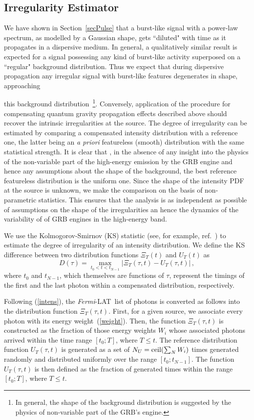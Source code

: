 \documentclass[12pt]{article}
\newcommand{\beq}{\begin{equation}}
\newcommand{\eeq}{\end{equation}}
\newcommand{\lat}{{\it Fermi}-LAT}
\begin{document}
\subsection{Irregularity Estimator}
\label{sec:ks}

We have shown in Section~\ref{secPulse} that a burst-like signal with a power-law spectrum,
as modelled by a Gaussian shape, gets ``diluted"
with time as it propagates in a dispersive medium. In general, a qualitatively similar result is expected
for a signal possessing any kind of  burst-like activity {superposed on a ``regular" background distribution}.
Thus we expect that during dispersive
propagation any irregular signal with burst-like features degenerates in shape, approaching
{this background distribution~\footnote{In general, the shape of the background distribution is suggested
by the physics of non-variable part of the GRB's engine.}.
Conversely, application of the procedure for compensating
quantum gravity propagation effects described above should
recover the intrinsic irregularities at the source. The degree of irregularity
can be estimated by comparing a compensated intensity distribution with a reference one, the latter being  an
{\it a priori} featureless {(smooth)} distribution with the same statistical strength.
It is clear that {, in the absence of any insight into the physics of the non-variable part of the
high-energy emission by the GRB engine and hence
any assumptions about the shape of the background,}
the best reference featureless distribution is the uniform one.
Since the shape of the intensity PDF at the source is unknown, we make the
comparison on the basis of non-parametric statistics.
This ensures that the analysis is as independent as possible of assumptions on the {shape of the
irregularities an hence the dynamics of the variability of of GRB engines in the high-energy band}.

We use the Kolmogorov-Smirnov (KS) statistic (see, for example, ref.~\cite{statBOOK1}) to estimate
the degree of irregularity of an intensity distribution. We define the KS difference between two
distribution functions $\Xi_T(t)$ and $U_T(t)$ as
\beq
D(\tau ) = \underset{t_0 < t < t_{N-1}}{\max}|\Xi_T(\tau ,t)-U_T(\tau ,t)| \, ,
\label{KSD1}
\eeq
where $t_0$ and $t_{N-1}$, which themselves are functions of $\tau $, represent the timings of the first and the
last photon within a compensated distribution, respectively.

Following (\ref{intens}), the \lat\ list of photons is converted as follows
into the distribution function $\Xi_T(\tau ,t)$. First, for a given source, we associate every photon with its energy weight~(\ref{weight}).
Then, the function $\Xi_T(\tau ,t)$ is constructed as the fraction of those energy weights $W_i$ whose
associated photons arrived within the time range $[t_0;T]$, where $T\le t$.
The reference distribution function $U_T(\tau ,t)$ is generated as a set of $N_U={\rm ceil}(\sum_NW_i)$
times generated randomly and distributed uniformly over the range $[t_0;t_{N-1}]$. The function $U_T(\tau ,t)$ is then defined as the
fraction of generated times within the range $[t_0;T]$, where $T\le t$.

}
\end{document}

